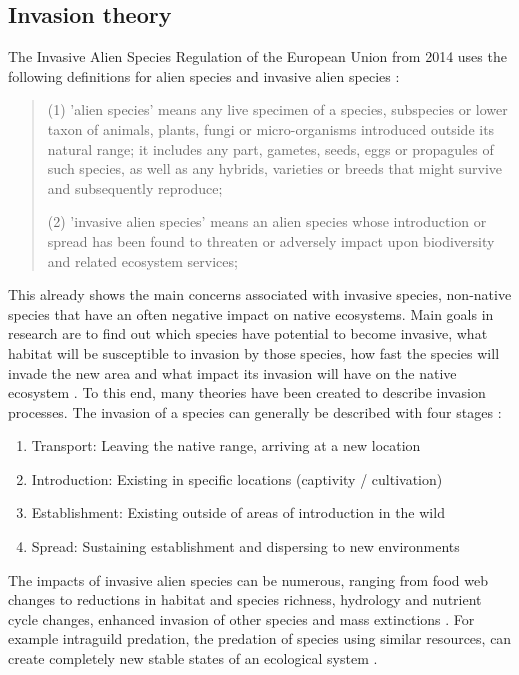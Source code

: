 \documentclass[12pt,a4paper]{article}
\begin{document}
\subsection{Invasion theory}
The Invasive Alien Species Regulation of the European Union from 2014 uses the following definitions for alien species and invasive alien species \autocite{EU2014LexIAS}:
\begin{quote}
    (1) 'alien species' means any live specimen of a species, subspecies or lower taxon of animals, plants, fungi or micro-organisms introduced outside its natural range; it includes any part, gametes, seeds, eggs or propagules of such species, as well as any hybrids, varieties or breeds that might survive and subsequently reproduce;

    (2) 'invasive alien species' means an alien species whose introduction or spread has been found to threaten or adversely impact upon biodiversity and related ecosystem services;
\end{quote}

This already shows the main concerns associated with invasive species, non-native species that have an often negative impact on native ecosystems.
Main goals in research are to find out which species have potential to become invasive, what habitat will be susceptible to invasion by those species, how fast the species will invade the new area and what impact its invasion will have on the native ecosystem \autocite{shigesada1997invasions}. 
To this end, many theories have been created to describe invasion processes.
The invasion of a species can  generally be described with four stages \autocite{blackburn2011invasionstages}: 
\begin{enumerate}
    \item Transport: Leaving the native range, arriving at a new location
    \item Introduction: Existing in specific locations (captivity / cultivation)
    \item Establishment: Existing outside of areas of introduction in the wild
    \item Spread: Sustaining establishment and dispersing to new environments
\end{enumerate}

The impacts of invasive alien species can be numerous, ranging from food web changes to reductions in habitat and species richness, hydrology and nutrient cycle changes, enhanced invasion of other species and mass extinctions \autocite{simberloff2013invasiveimpacts}.
For example intraguild predation, the predation of species using similar resources, can create completely new stable states of an ecological system \autocite{polis1989theoryIGP}.
\end{document}
